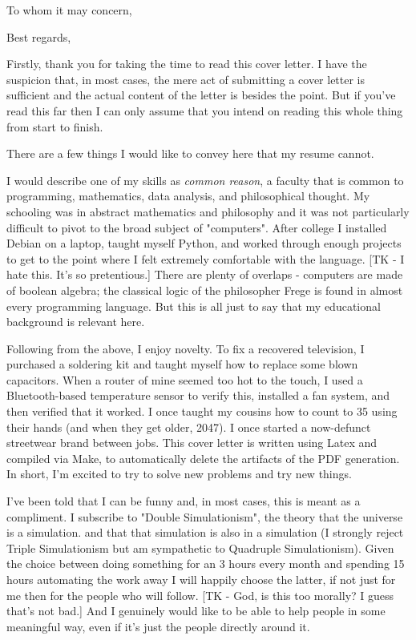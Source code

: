 \documentclass[12pt,a4paper,sans]{moderncv}        %
\begin{document}
\date{DD mon YYYY}
\opening{To whom it may concern,}
\closing{Best regards,}
\makelettertitle

Firstly, thank you for taking the time to read this cover letter. I have the suspicion that, in most cases, the mere act of submitting a cover letter is sufficient and the actual content of the letter is besides the point. But if you've read this far then I can only assume that you intend on reading this whole thing from start to finish.

There are a few things I would like to convey here that my resume cannot.

I would describe one of my skills as \textit{common reason}, a faculty that is common to programming, mathematics, data analysis, and philosophical thought. My schooling was in abstract mathematics and philosophy and it was not particularly difficult to pivot to the broad subject of "computers". After college I installed Debian on a laptop, taught myself Python, and worked through enough projects to get to the point where I felt extremely comfortable with the language. [TK - I hate this. It's so pretentious.] There are plenty of overlaps - computers are made of boolean algebra; the classical logic of the philosopher Frege is found in almost every programming language. But this is all just to say that my educational background is relevant here.

Following from the above, I enjoy novelty. To fix a recovered television, I purchased a soldering kit and taught myself how to replace some blown capacitors. When a router of mine seemed too hot to the touch, I used a Bluetooth-based temperature sensor to verify this, installed a fan system, and then verified that it worked. I once taught my cousins how to count to 35 using their hands (and when they get older, 2047). I once started a now-defunct streetwear brand between jobs. This cover letter is written using Latex and compiled via Make, to automatically delete the artifacts of the PDF generation. In short, I'm excited to try to solve new problems and try new things.

I've been told that I can be funny and, in most cases, this is meant as a compliment. I subscribe to "Double Simulationism", the theory that the universe is a simulation. and that that simulation is also in a simulation (I strongly reject Triple Simulationism but am sympathetic to Quadruple Simulationism). Given the choice between doing something for an 3 hours every month and spending 15 hours automating the work away I will happily choose the latter, if not just for me then for the people who will follow. [TK - God, is this too morally? I guess that's not bad.] And I genuinely would like to be able to help people in some meaningful way, even if it's just the people directly around it.
\end{document}
